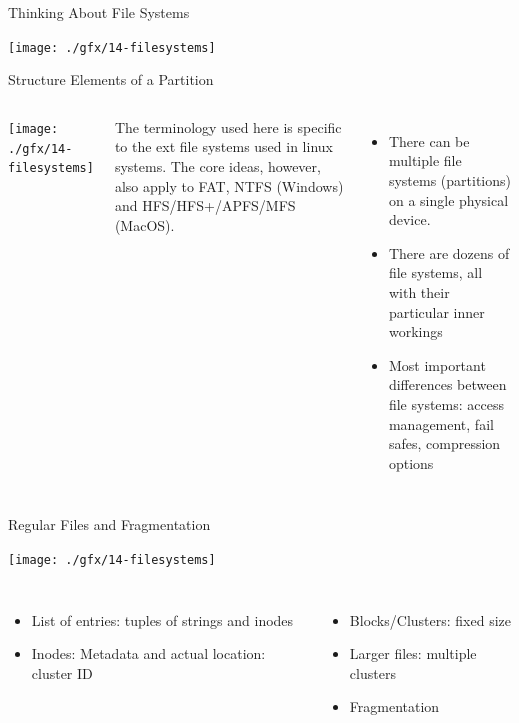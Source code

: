 
\begin{frame}{Thinking About File Systems}
%
\begin{center}
	\texttt{[image: ./gfx/14-filesystems]}
\end{center}
%
\end{frame}


\begin{frame}{Structure Elements of a Partition}
%
\begin{columns}[T]
	\texttt{[image: ./gfx/14-filesystems]}
	
	\scriptsize
	The terminology used here is specific to the ext file systems used in linux systems. The core ideas, however, also apply to FAT, NTFS (Windows) and HFS/HFS+/APFS/MFS (MacOS).
%
	\small
	\begin{itemize}
	\item There can be multiple file systems (partitions) on a single physical device.
	\item There are dozens of file systems, all with their particular inner workings
	\item Most important differences between file systems: access management, fail safes, compression options
	\end{itemize}
\end{columns}
%
\end{frame}


\begin{frame}{Regular Files and Fragmentation}
%
\vspace{-3pt}
\begin{center}
\texttt{[image: ./gfx/14-filesystems]}
\end{center}

\vspace{-3pt}
\begin{columns}
	\begin{itemize}
	\item List of entries: tuples of strings and inodes
	\item Inodes: Metadata and actual location: cluster ID
	\end{itemize}
%
	\begin{itemize}
	\item Blocks/Clusters: fixed size
	\item Larger files: multiple clusters
	\item[\Thus] Fragmentation
	\end{itemize}
\end{columns}
%
\end{frame}

